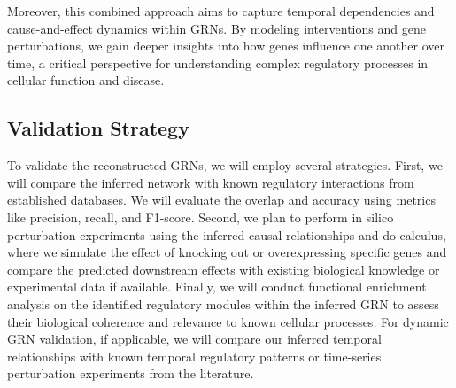 Moreover, this combined approach aims to capture temporal dependencies and cause-and-effect dynamics within GRNs. By modeling interventions and gene perturbations, we gain deeper insights into how genes influence one another over time, a critical perspective for understanding complex regulatory processes in cellular function and disease.

\subsection{Validation Strategy}
To validate the reconstructed GRNs, we will employ several strategies. First, we will compare the inferred network with known regulatory interactions from established databases. We will evaluate the overlap and accuracy using metrics like precision, recall, and F1-score. Second, we plan to perform in silico perturbation experiments using the inferred causal relationships and do-calculus, where we simulate the effect of knocking out or overexpressing specific genes and compare the predicted downstream effects with existing biological knowledge or experimental data if available. Finally, we will conduct functional enrichment analysis on the identified regulatory modules within the inferred GRN to assess their biological coherence and relevance to known cellular processes. For dynamic GRN validation, if applicable, we will compare our inferred temporal relationships with known temporal regulatory patterns or time-series perturbation experiments from the literature.
